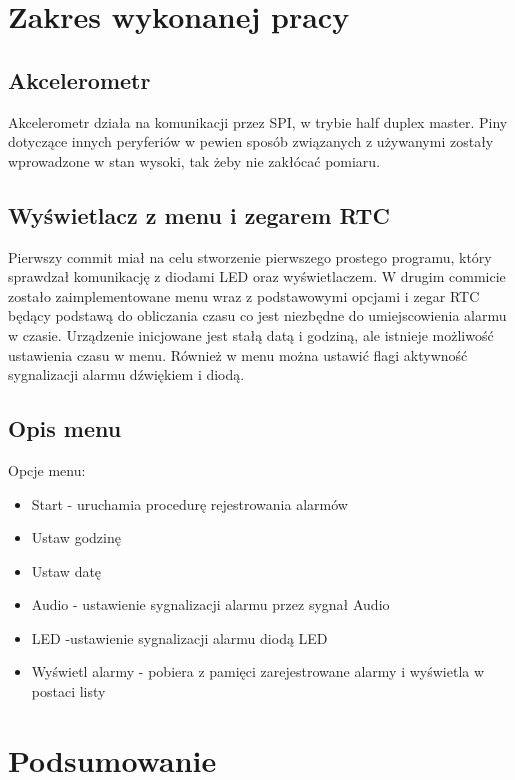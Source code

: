 \documentclass[10pt, a4paper]{article}
\begin{document}
\section{Zakres wykonanej pracy}
\subsection{Akcelerometr}
Akcelerometr działa na komunikacji przez SPI, w trybie half duplex master. Piny dotyczące innych peryferiów w pewien sposób związanych z używanymi zostały wprowadzone w stan wysoki, tak żeby nie zakłócać pomiaru.
\subsection{Wyświetlacz z menu i zegarem RTC}
Pierwszy commit miał na celu stworzenie pierwszego prostego programu, który sprawdzał komunikację z diodami LED oraz wyświetlaczem.
W drugim commicie zostało zaimplementowane menu wraz z podstawowymi opcjami i zegar RTC będący podstawą do obliczania czasu co jest niezbędne do umiejscowienia alarmu w czasie. Urządzenie inicjowane jest stałą datą i godziną, ale istnieje możliwość ustawienia czasu w menu. Również w menu można ustawić flagi aktywność sygnalizacji alarmu dźwiękiem i diodą.



\subsection{Opis menu}

Opcje menu:
\begin {itemize}
\item Start - uruchamia procedurę rejestrowania alarmów
\item Ustaw godzinę
\item Ustaw datę
\item Audio - ustawienie sygnalizacji alarmu przez sygnał Audio
\item LED -ustawienie sygnalizacji alarmu diodą LED
\item Wyświetl alarmy - pobiera z pamięci zarejestrowane alarmy i wyświetla w postaci listy

\end {itemize}

\section{Podsumowanie}
\end{document}
